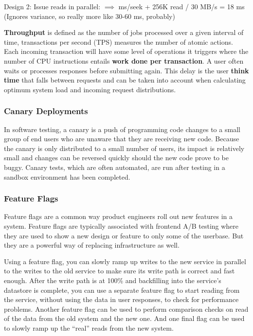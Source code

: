 \documentclass{article}
\begin{document}
    Design 2: Issue reads in parallel: $\implies$  ms/seek + 256K read / 30 MB/s = 18 ms (Ignores variance, so really more like 30-60 ms, probably)
    
    \textbf{Throughput} is defined as the number of jobs processed over a given interval of time, transactions per second (TPS) measures the number of atomic actions. Each incoming transaction will have some level of operations it triggers where the number of CPU instructions entails \textbf{work done per transaction}. A user often waits or processes responses before submitting again. This delay is the user \textbf{think time} that falls between requests and can be taken into account when calculating optimum system load and incoming request distributions.
    
    \subsubsection{Canary Deployments}
    In software testing, a canary is a push of programming code changes to a small group of end users who are unaware that they are receiving new code. Because the canary is only distributed to a small number of users, its impact is relatively small and changes can be reversed quickly should the new code prove to be buggy. Canary tests, which are often automated, are run after testing in a sandbox environment has been completed.
    
    \subsubsection{Feature Flags}
    Feature flags are a common way product engineers roll out new features in a system. Feature flags are typically associated with frontend A/B testing where they are used to show a new design or feature to only some of the userbase. But they are a powerful way of replacing infrastructure as well.
    
    Using a feature flag, you can slowly ramp up writes to the new service in parallel to the writes to the old service to make sure its write path is correct and fast enough. After the write path is at 100\% and backfilling into the service’s datastore is complete, you can use a separate feature flag to start reading from the service, without using the data in user responses, to check for performance problems. Another feature flag can be used to perform comparison checks on read of the data from the old system and the new one. And one final flag can be used to slowly ramp up the ``real” reads from the new system.
\end{document}
